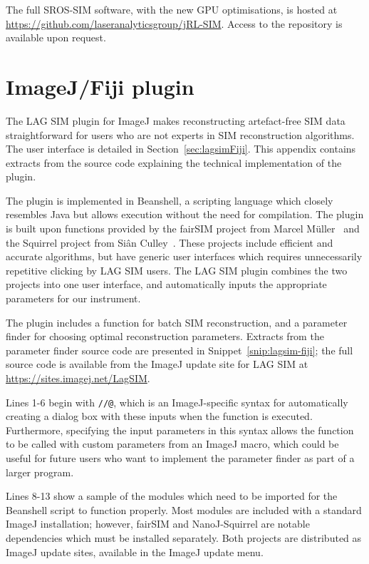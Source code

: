 The full SROS-SIM software, with the new GPU optimisations, is hosted at \url{https://github.com/laseranalyticsgroup/jRL-SIM}. Access to the repository is available upon request. 


\section{ImageJ/Fiji plugin} \label{appx:fiji-lagsim}
The LAG SIM plugin for ImageJ makes reconstructing artefact-free SIM data straightforward for users who are not experts in SIM reconstruction algorithms. 
The user interface is detailed in Section~\ref{sec:lagsimFiji}. 
This appendix contains extracts from the source code explaining the technical implementation of the plugin. 

The plugin is implemented in Beanshell, a scripting language which closely resembles Java but allows execution without the need for compilation. 
The plugin is built upon functions provided by the fairSIM project from Marcel M{\"u}ller~\cite{muller2016open} and the Squirrel project from Si{\^a}n Culley~\cite{culley2018quantitative}. 
These projects include efficient and accurate algorithms, but have generic user interfaces which requires unnecessarily repetitive clicking by LAG SIM users. 
The LAG SIM plugin combines the two projects into one user interface, and automatically inputs the appropriate parameters for our instrument. 

The plugin includes a function for batch SIM reconstruction, and a parameter finder for choosing optimal reconstruction parameters. 
Extracts from the parameter finder source code are presented in Snippet~\ref{snip:lagsim-fiji}; the full source code is available from the ImageJ update site for LAG SIM at \url{https://sites.imagej.net/LagSIM}. 

Lines 1-6 begin with \texttt{//@}, which is an ImageJ-specific syntax for automatically creating a dialog box with these inputs when the function is executed. 
Furthermore, specifying the input parameters in this syntax allows the function to be called with custom parameters from an ImageJ macro, which could be useful for future users who want to implement the parameter finder as part of a larger program. 

Lines 8-13 show a sample of the modules which need to be imported for the Beanshell script to function properly. 
Most modules are included with a standard ImageJ installation; however, fairSIM and NanoJ-Squirrel are notable dependencies which must be installed separately. 
Both projects are distributed as ImageJ update sites, available in the ImageJ update menu. 

